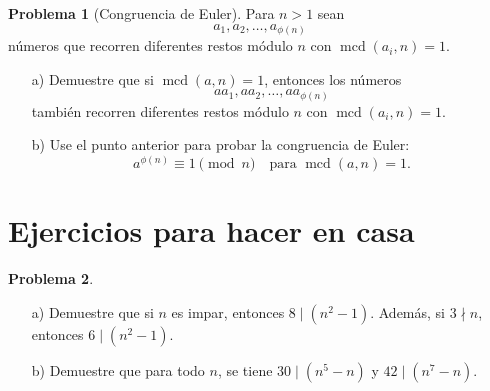 \documentclass{article}
\DeclareMathOperator{\mcd}{mcd}
\theoremstyle{definition}
\newtheorem{problema}{Problema}
\newenvironment{solucion}{\begin{proof}[Solución]\small}{\end{proof}}
\begin{document}
\begin{problema}[Congruencia de Euler]
  Para $n > 1$ sean
  $$a_1, a_2, \ldots, a_{\phi (n)}$$
  números que recorren diferentes restos módulo $n$ con $\mcd (a_i,n) = 1$.

  \begin{enumerate}
  \item[a)] Demuestre que si $\mcd (a,n) = 1$, entonces los números
    $$aa_1, aa_2, \ldots, aa_{\phi (n)}$$
    también recorren diferentes restos módulo $n$ con $\mcd (a_i,n) = 1$.

  \item[b)] Use el punto anterior para probar la congruencia de Euler:
    $$a^{\phi (n)} \equiv 1 \pmod{n} \quad \text{para }\mcd (a,n) = 1.$$
  \end{enumerate}



\end{problema}

\pagebreak

\section*{Ejercicios para hacer en casa}

\begin{problema}
  ~

  \begin{enumerate}
  \item[a)] Demuestre que si $n$ es impar, entonces $8 \mid (n^2 - 1)$. Además,
    si $3\nmid n$, entonces $6 \mid (n^2 - 1)$.

  \item[b)] Demuestre que para todo $n$, se tiene $30 \mid (n^5 - n)$ y
    $42 \mid (n^7 - n)$.
  \end{enumerate}
\end{problema}
\end{document}
